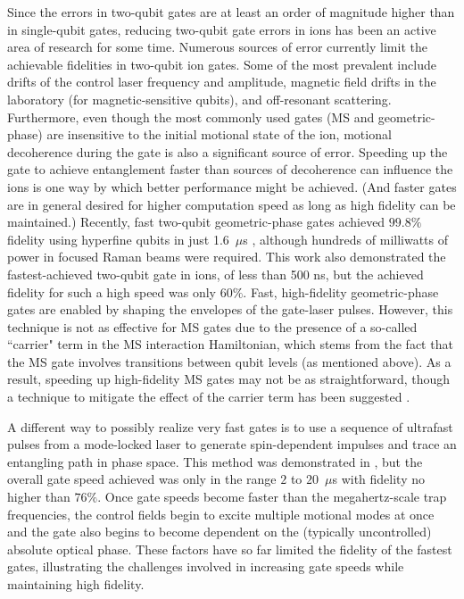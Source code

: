 \documentclass[%
12pt,
 amsmath,amssymb,
]{revtex4-2}
\begin{document}
Since the errors in two-qubit gates are at least an order of magnitude higher than in single-qubit gates, reducing two-qubit gate errors in ions has been an active area of research for some time. Numerous sources of error currently limit the achievable fidelities in two-qubit ion gates. Some of the most prevalent include drifts of the control laser frequency and amplitude, magnetic field drifts in the laboratory (for magnetic-sensitive qubits), and off-resonant scattering. Furthermore, even though the most commonly used gates (MS and geometric-phase) are insensitive to the initial motional state of the ion, motional decoherence during the gate is also a significant source of error. Speeding up the gate to achieve entanglement faster than sources of decoherence can influence the ions is one way by which better performance might be achieved. (And faster gates are in general desired for higher computation speed as long as high fidelity can be maintained.)  Recently, fast two-qubit geometric-phase gates \cite{SteanePulseGates2014} achieved $99.8 \%$ fidelity using hyperfine qubits in just 1.6~$\mu$s \cite{SchaferFastIonGates2018}, although hundreds of milliwatts of power in focused Raman beams were required. This work also demonstrated the fastest-achieved two-qubit gate in ions, of less than 500 ns, but the achieved fidelity for such a high speed was only $60 \%$.  Fast, high-fidelity geometric-phase gates are enabled by shaping the envelopes of the gate-laser pulses.  However, this technique is not as effective for MS gates due to the presence of a so-called ``carrier" term in the MS interaction Hamiltonian, which stems from the fact that the MS gate involves transitions between qubit levels (as mentioned above).  As a result, speeding up high-fidelity MS gates may not be as straightforward, though a technique to mitigate the effect of the carrier term has been suggested \cite{MehtaSPIE2019}.

A different way to possibly realize very fast gates is to use a sequence of ultrafast pulses from a mode-locked laser to generate spin-dependent impulses and trace an entangling path in phase space. This method was demonstrated in \cite{WongCamposUltrafast2017}, but the overall gate speed achieved was only in the range $2$ to $20$~$\mu$s with fidelity no higher than $76 \%$. Once gate speeds become faster than the megahertz-scale trap frequencies, the control fields begin to excite multiple motional modes at once and the gate also begins to become dependent on the (typically uncontrolled) absolute optical phase. These factors have so far limited the fidelity of the fastest gates, illustrating the challenges involved in increasing gate speeds while maintaining high fidelity.
\end{document}
